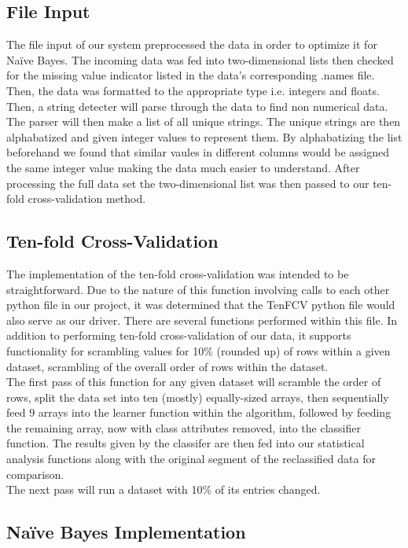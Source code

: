 \documentclass[twoside,11pt]{article}
\begin{document}
\subsection{File Input}
The file input of our system preprocessed the data in order to optimize it for Naïve Bayes. 
The incoming data was fed into two-dimensional lists then checked for the missing value indicator
listed in the data's corresponding .names file. Then, the data was formatted to the appropriate 
type i.e. integers and floats. Then, a string detecter will parse through the data to find
non numerical data. The parser will then make a list of all unique strings. The unique strings 
are then alphabatized and given integer values to represent them. By alphabatizing the list
beforehand we found that similar vaules in different columns would be assigned the same integer
value making the data much easier to understand. After processing the full data set the two-dimensional
 list was then passed to our ten-fold cross-validation method.  
\subsection{Ten-fold Cross-Validation}

The implementation of the ten-fold cross-validation was intended to be straightforward. 
Due to the nature of this function involving calls to each other python file in our 
project, it was determined that the TenFCV python file would also serve as our driver. 
There are several functions performed within this file. In addition to performing 
ten-fold cross-validation of our data, it supports functionality for scrambling values for 
10\% (rounded up) of rows within a given dataset, scrambling of the overall order of 
rows within the dataset.\\
The first pass of this function for any given dataset will scramble the order of rows, 
split the data set into ten (mostly) equally-sized arrays, then sequentially feed 9 arrays 
into the learner function within the algorithm, followed by feeding the remaining array, 
now with class attributes removed, into the classifier function. The results given by 
the classifer are then fed into our statistical analysis functions along with the original 
segment of the reclassified data for comparison.\\
The next pass will run a dataset with 10\% of its entries changed.\\

\subsection{Naïve Bayes Implementation}
\end{document}
